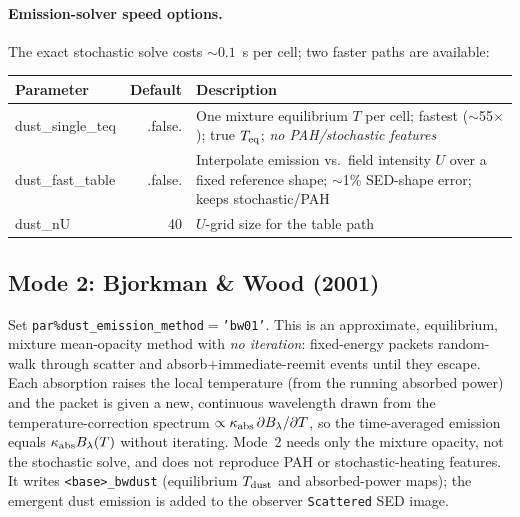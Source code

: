 \documentclass[english,a4paper]{kiseon_memo}
\newcommand{\pp}[1]{\texttt{par\%#1}}
\newcommand{\code}[1]{\texttt{#1}}
\newcommand{\file}[1]{\texttt{#1}}
\begin{document}
\paragraph{Emission-solver speed options.}  The exact stochastic solve costs
$\sim 0.1$~s per cell; two faster paths are available:
\begin{longtable}{P D X}
\toprule
\textrm{Parameter} & \textrm{Default} & \textrm{Description}\\
\midrule \endhead
dust\_single\_teq  & .false. & One mixture equilibrium $T$ per cell; fastest ($\sim$55$\times$); true $T_{\rm eq}$; \emph{no PAH/stochastic features}\\
dust\_fast\_table  & .false. & Interpolate emission vs.\ field intensity $U$ over a fixed reference shape; $\sim$1\% SED-shape error; keeps stochastic/PAH\\
dust\_nU           & 40      & $U$-grid size for the table path\\
\bottomrule
\end{longtable}

\subsection{Mode 2: Bjorkman \& Wood (2001)}\label{sec:bw}
Set \pp{dust\_emission\_method}${}={}$\code{'bw01'}.  This is an approximate,
equilibrium, mixture mean-opacity method with \emph{no iteration}: fixed-energy
packets random-walk through scatter and absorb$+$immediate-reemit events until
they escape.  Each absorption raises the local temperature (from the running
absorbed power) and the packet is given a new, continuous wavelength drawn from
the temperature-correction spectrum $\propto \kappa_{\rm abs}\,\partial
B_\lambda/\partial T$, so the time-averaged emission equals
$\kappa_{\rm abs}B_\lambda(T)$ without iterating.  Mode~2 needs only the
mixture opacity, not the stochastic solve, and does not reproduce PAH or
stochastic-heating features.  It writes \file{<base>\_bwdust} (equilibrium
$T_{\rm dust}$ and absorbed-power maps); the emergent dust emission is added to
the observer \code{Scattered} SED image.
\end{document}

